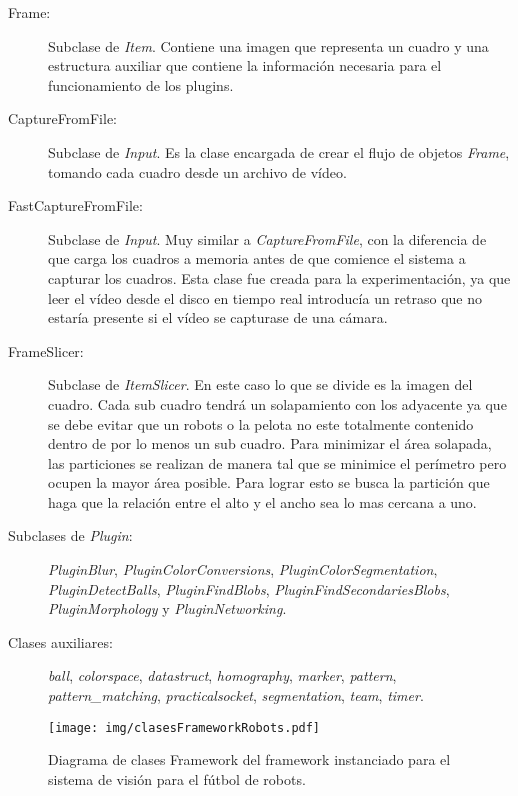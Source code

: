 \begin{description}

\item[Frame:] Subclase de \emph{Item}. Contiene una imagen que representa un
	cuadro y una estructura auxiliar que contiene la información necesaria
	para el funcionamiento de los plugins.

\item[CaptureFromFile:] Subclase de \emph{Input}. Es la clase encargada de crear
	el flujo de objetos \emph{Frame}, tomando cada cuadro desde un archivo
	de vídeo.

\item[FastCaptureFromFile:] Subclase de \emph{Input}. Muy similar a
	\emph{CaptureFromFile}, con la diferencia de que carga los cuadros a
	memoria antes de que comience el sistema a capturar los cuadros. Esta
	clase fue creada para la experimentación, ya que leer el vídeo desde el
	disco en tiempo real introducía un retraso que no estaría presente si el
	vídeo se capturase de una cámara.

\item[FrameSlicer:] Subclase de \emph{ItemSlicer}. En este caso lo que se divide
	es la imagen del cuadro. Cada sub cuadro tendrá un solapamiento con los
	adyacente ya que se debe evitar que un robots o la pelota no este
	totalmente contenido dentro de por lo menos un sub cuadro. Para
	minimizar el área solapada, las particiones se realizan de manera tal
	que se minimice el perímetro pero ocupen la mayor área posible. Para
	lograr esto se busca la partición que haga que la relación entre el alto
	y el ancho sea lo mas cercana a uno.

\item[Subclases de \emph{Plugin}:] \emph{PluginBlur},
	\emph{PluginColorConversions}, \emph{PluginColorSegmentation},
	\emph{PluginDetectBalls}, \emph{PluginFindBlobs},
	\emph{PluginFindSecondariesBlobs}, \emph{PluginMorphology} y
	\emph{PluginNetworking}.

\item[Clases auxiliares:] \emph{ball}, \emph{colorspace}, \emph{datastruct},
	\emph{homography}, \emph{marker}, \emph{pattern},
	\emph{pattern\_matching}, \emph{practicalsocket}, \emph{segmentation},
	\emph{team}, \emph{timer}.

\end{description}

\begin{figure}[h]

	\texttt{[image: img/clasesFrameworkRobots.pdf]}

	\caption{Diagrama de clases Framework del framework instanciado para el
	sistema de visión para el fútbol de robots.}

\end{figure}

